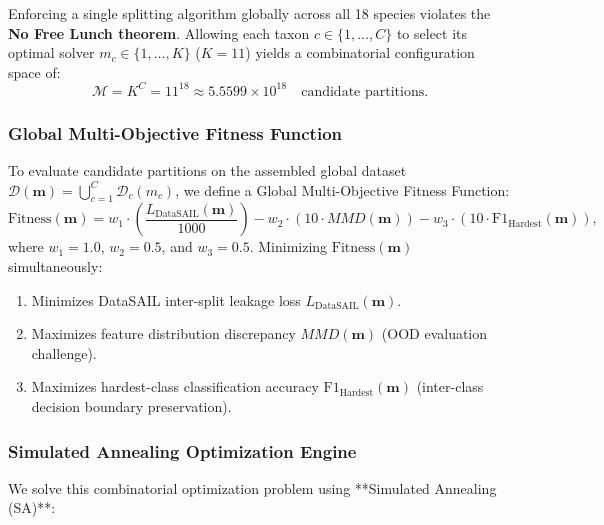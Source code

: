 Enforcing a single splitting algorithm globally across all 18 species violates the \textbf{No Free Lunch theorem}. Allowing each taxon $c \in \{1, \dots, C\}$ to select its optimal solver $m_c \in \{1, \dots, K\}$ ($K=11$) yields a combinatorial configuration space of:
\begin{equation}
\mathcal{M} = K^C = 11^{18} \approx 5.5599 \times 10^{18} \quad \text{candidate partitions.}
\end{equation}

\subsubsection{Global Multi-Objective Fitness Function}
To evaluate candidate partitions on the assembled global dataset $\mathcal{D}(\boldsymbol{m}) = \bigcup_{c=1}^C \mathcal{D}_c(m_c)$, we define a Global Multi-Objective Fitness Function:
\begin{equation}
\mathrm{Fitness}(\boldsymbol{m}) = w_1 \cdot \left( \frac{L_{\text{DataSAIL}}(\boldsymbol{m})}{1000} \right) - w_2 \cdot \left( 10 \cdot MMD(\boldsymbol{m}) \right) - w_3 \cdot \left( 10 \cdot \mathrm{F1}_{\text{Hardest}}(\boldsymbol{m}) \right),
\label{eq:multi_obj_fitness}
\end{equation}
where $w_1 = 1.0$, $w_2 = 0.5$, and $w_3 = 0.5$. Minimizing $\mathrm{Fitness}(\boldsymbol{m})$ simultaneously:
\begin{enumerate}[label=\textbf{(\arabic*)}, leftmargin=*]
\item Minimizes DataSAIL inter-split leakage loss $L_{\text{DataSAIL}}(\boldsymbol{m})$.
\item Maximizes feature distribution discrepancy $MMD(\boldsymbol{m})$ (OOD evaluation challenge).
\item Maximizes hardest-class classification accuracy $\mathrm{F1}_{\text{Hardest}}(\boldsymbol{m})$ (inter-class decision boundary preservation).
\end{enumerate}

\subsubsection{Simulated Annealing Optimization Engine}
We solve this combinatorial optimization problem using **Simulated Annealing (SA)**:

